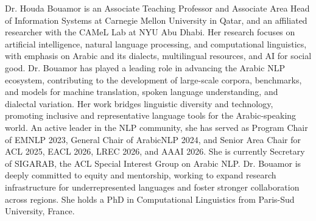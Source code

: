 Dr. Houda Bouamor is an Associate Teaching Professor and Associate Area Head of Information Systems at Carnegie Mellon University in Qatar, and an affiliated researcher with the CAMeL Lab at NYU Abu Dhabi. Her research focuses on artificial intelligence, natural language processing, and computational linguistics, with emphasis on Arabic and its dialects, multilingual resources, and AI for social good. Dr. Bouamor has played a leading role in advancing the Arabic NLP ecosystem, contributing to the development of large-scale corpora, benchmarks, and models for machine translation, spoken language understanding, and dialectal variation. Her work bridges linguistic diversity and technology, promoting inclusive and representative language tools for the Arabic-speaking world. An active leader in the NLP community, she has served as Program Chair of EMNLP 2023, General Chair of ArabicNLP 2024, and Senior Area Chair for ACL 2025, EACL 2026, LREC 2026, and AAAI 2026. She is currently Secretary of SIGARAB, the ACL Special Interest Group on Arabic NLP. Dr. Bouamor is deeply committed to equity and mentorship, working to expand research infrastructure for underrepresented languages and foster stronger collaboration across regions. She holds a PhD in Computational Linguistics from Paris-Sud University, France.

